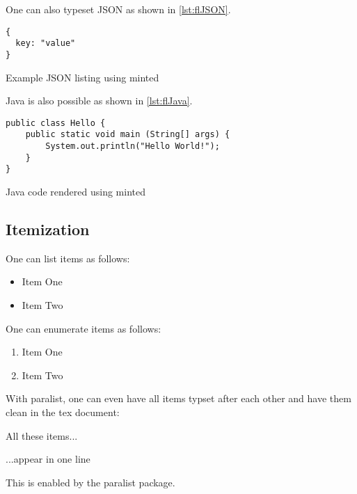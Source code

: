 \documentclass[ngerman,runningheads,a4paper]{llncs}[2018/03/10]
\begin{document}
One can also typeset JSON as shown in \cref{lst:flJSON}.

\begin{ltgexample}
\begin{listing}[htbp]
    \begin{verbatim}
{
  key: "value"
}
\end{verbatim}
  \caption{Example JSON listing using minted}
  \label{lst:flJSON}
\end{listing}
\end{ltgexample}

Java is also possible as shown in \cref{lst:flJava}.

\begin{ltgexample}
\begin{listing}[htbp]
    \begin{verbatim}
public class Hello {
    public static void main (String[] args) {
        System.out.println("Hello World!");
    }
}
\end{verbatim}
  \caption{Java code rendered using minted}
  \label{lst:java}
\end{listing}
\end{ltgexample}

\subsection{Itemization}

One can list items as follows:

\begin{ltgexample}
\begin{itemize}
\item Item One
\item Item Two
\end{itemize}
\end{ltgexample}


One can enumerate items as follows:

\begin{ltgexample}
\begin{enumerate}
  \item Item One
  \item Item Two
\end{enumerate}
\end{ltgexample}


With paralist, one can even have all items typset after each other and have them clean in the tex document:

\begin{ltgexample}
\begin{inparaenum}
  \item All these items...
  \item ...appear in one line
  \item This is enabled by the paralist package.
\end{inparaenum}
\end{ltgexample}
\end{document}
